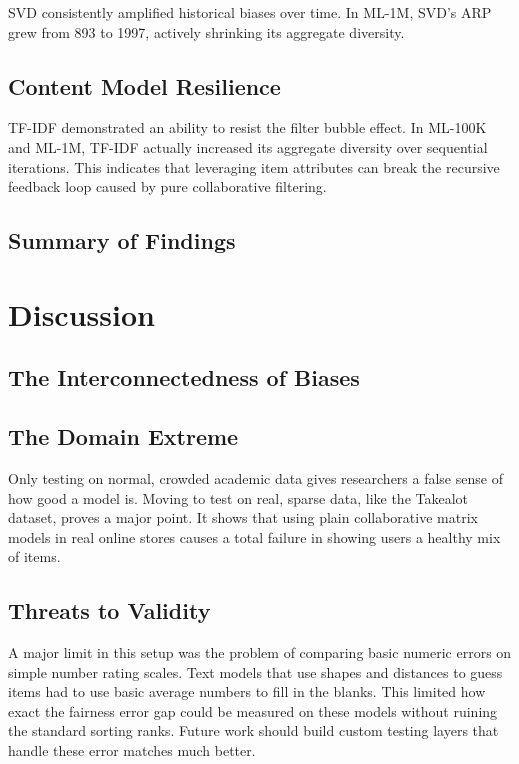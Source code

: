 \documentclass[11pt,a4paper]{report}
\begin{document}
SVD consistently amplified historical biases over time. In ML-1M, SVD's ARP grew from 893 to 1997, actively shrinking its aggregate diversity.

\section{Content Model Resilience}
TF-IDF demonstrated an ability to resist the filter bubble effect. In ML-100K and ML-1M, TF-IDF actually increased its aggregate diversity over sequential iterations. This indicates that leveraging item attributes can break the recursive feedback loop caused by pure collaborative filtering.

\section{Summary of Findings}

\chapter{Discussion}
\label{ch:discussion}

\section{The Interconnectedness of Biases}

\section{The Domain Extreme}
Only testing on normal, crowded academic data gives researchers a false sense of how good a model is. Moving to test on real, sparse data, like the Takealot dataset, proves a major point. It shows that using plain collaborative matrix models in real online stores causes a total failure in showing users a healthy mix of items.

\section{Threats to Validity}
A major limit in this setup was the problem of comparing basic numeric errors on simple number rating scales. Text models that use shapes and distances to guess items had to use basic average numbers to fill in the blanks. This limited how exact the fairness error gap could be measured on these models without ruining the standard sorting ranks. Future work should build custom testing layers that handle these error matches much better.
\end{document}
